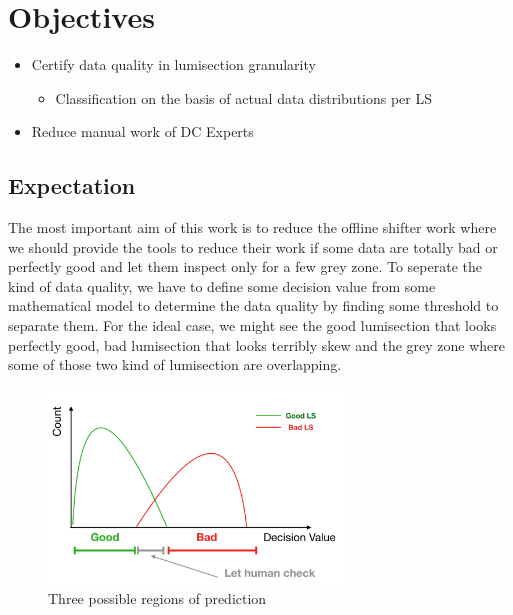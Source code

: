 \chapter{Objectives}

\begin{itemize}
    \item Certify data quality in lumisection granularity
    \begin{itemize}
        \item Classification on the basis of actual data distributions per LS
    \end{itemize}
    \item Reduce manual work of DC Experts
\end{itemize}

\section{Expectation}
The most important aim of this work is to reduce the offline shifter work where we should provide the tools to reduce their work if some data are totally bad or perfectly good and let them inspect only for a few grey zone.
To seperate the kind of data quality, we have to define some decision value from some mathematical model to determine the data quality by finding some threshold to separate them.
For the ideal case, we might see the good lumisection that looks perfectly good, bad lumisection that looks terribly skew and the grey zone where some of those two kind of lumisection are overlapping.

\begin{figure}[h!]
    \centering
    \includegraphics[width=0.7\textwidth]{images/expected_greyzone.png}
    \caption{Three possible regions of prediction}
    \label{fig:expected_greyzone}
\end{figure}

